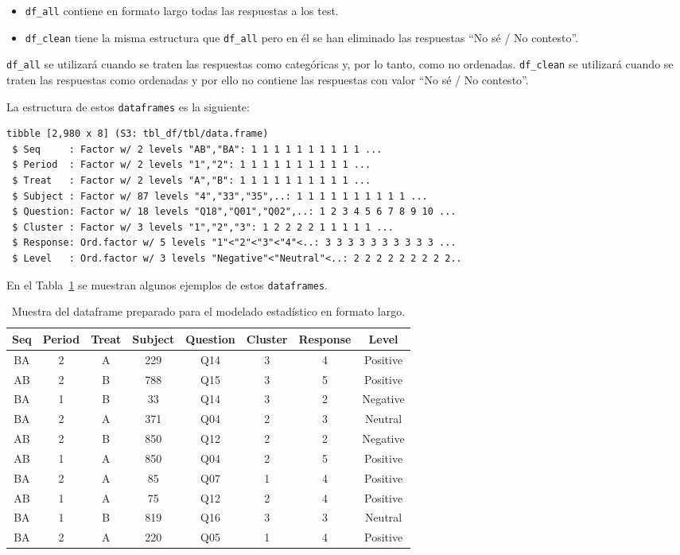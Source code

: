 \documentclass[
  12pt,
  a4paper,
  extrafontsizes,
  onecolumn,
  openright]{memoir}
\providecommand{\tightlist}{%
  \setlength{\itemsep}{0pt}\setlength{\parskip}{0pt}}\usepackage{longtable,booktabs,array}
\begin{document}
\begin{itemize}
\tightlist
\item
  \texttt{df\_all} contiene en formato largo todas las respuestas a los
  test.
\item
  \texttt{df\_clean} tiene la misma estructura que \texttt{df\_all} pero
  en él se han eliminado las respuestas \enquote{No sé / No contesto}.
\end{itemize}

\texttt{df\_all} se utilizará cuando se traten las respuestas como
categóricas y, por lo tanto, como no ordenadas. \texttt{df\_clean} se
utilizará cuando se traten las respuestas como ordenadas y por ello no
contiene las respuestas con valor \enquote{No sé / No contesto}.

La estructura de estos \texttt{dataframes} es la siguiente:

\begin{verbatim}
tibble [2,980 x 8] (S3: tbl_df/tbl/data.frame)
 $ Seq     : Factor w/ 2 levels "AB","BA": 1 1 1 1 1 1 1 1 1 1 ...
 $ Period  : Factor w/ 2 levels "1","2": 1 1 1 1 1 1 1 1 1 1 ...
 $ Treat   : Factor w/ 2 levels "A","B": 1 1 1 1 1 1 1 1 1 1 ...
 $ Subject : Factor w/ 87 levels "4","33","35",..: 1 1 1 1 1 1 1 1 1 1 ...
 $ Question: Factor w/ 18 levels "Q18","Q01","Q02",..: 1 2 3 4 5 6 7 8 9 10 ...
 $ Cluster : Factor w/ 3 levels "1","2","3": 1 2 2 2 2 1 1 1 1 1 ...
 $ Response: Ord.factor w/ 5 levels "1"<"2"<"3"<"4"<..: 3 3 3 3 3 3 3 3 3 3 ...
 $ Level   : Ord.factor w/ 3 levels "Negative"<"Neutral"<..: 2 2 2 2 2 2 2 2 2..
\end{verbatim}

En el Tabla~\ref{tbl-df_clean} se muestran algunos ejemplos de estos
\texttt{dataframes}.

\hypertarget{tbl-df_clean}{}
\begin{longtable}{cccccccc}
\caption{\label{tbl-df_clean}Muestra del dataframe preparado para el modelado estadístico en formato
largo. }\tabularnewline

\toprule
Seq & Period & Treat & Subject & Question & Cluster & Response & Level \\ 
\midrule
BA & 2 & A & 229 & Q14 & 3 & 4 & Positive \\ 
AB & 2 & B & 788 & Q15 & 3 & 5 & Positive \\ 
BA & 1 & B & 33 & Q14 & 3 & 2 & Negative \\ 
BA & 2 & A & 371 & Q04 & 2 & 3 & Neutral \\ 
AB & 2 & B & 850 & Q12 & 2 & 2 & Negative \\ 
AB & 1 & A & 850 & Q04 & 2 & 5 & Positive \\ 
BA & 2 & A & 85 & Q07 & 1 & 4 & Positive \\ 
AB & 1 & A & 75 & Q12 & 2 & 4 & Positive \\ 
BA & 1 & B & 819 & Q16 & 3 & 3 & Neutral \\ 
BA & 2 & A & 220 & Q05 & 1 & 4 & Positive \\ 
\bottomrule
\end{longtable}
\end{document}
